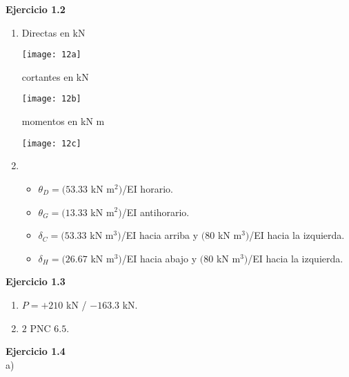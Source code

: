 \textbf{Ejercicio 1.2}\\

\begin{enumerate}[label=\alph*)]
	\item Directas en kN


\begin{center}
	\texttt{[image: 12a]}
\end{center}

cortantes en kN

\begin{center}
	\texttt{[image: 12b]}
\end{center}

momentos en kN m

\begin{center}
	\texttt{[image: 12c]}
\end{center}
\addtocounter{enumi}{1}

\item 
\begin{itemize}
\item $\theta_D = (53.33$ kN m$^2)$/EI horario.
\item $ \theta_G = (13.33$ kN m$^2)$/EI antihorario.
\item $ \delta_C = (53.33 $ kN m$^3)$/EI hacia arriba y $(80$ kN m$^3)$/EI hacia la izquierda.
\item  $\delta_H = (26.67$ kN m$^3)$/EI hacia abajo y $(80$ kN m$^3)$/EI hacia la izquierda.
\end{itemize} 
\end{enumerate}





\textbf{Ejercicio 1.3}\\

\begin{enumerate}[label=\alph*)]
	
\item $P = +210$ kN / $- 163.3$ kN.

\item $2$ PNC $6.5$.

\end{enumerate}


\textbf{Ejercicio 1.4}\\
a)

